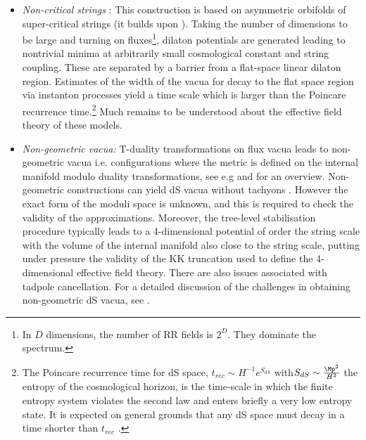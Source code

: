 \begin{itemize}

\item {\it Non-critical strings} \cite{Maloney:2002rr}: This construction is based on asymmetric orbifolds of super-critical strings
(it builds upon \cite{Silverstein:2001xn}).
 Taking  the  number of dimensions to be large and turning on fluxes\footnote{In $D$ dimensions, the number of RR fields
 is $2^{D}$. They dominate the spectrum.}, dilaton potentials are generated leading to nontrivial minima at arbitrarily small cosmological constant and string coupling. These are  separated by a barrier from a flat-space linear dilaton region. 
Estimates of the width of the vacua for decay to the flat space region via  instanton  processes yield a time scale which is larger than the Poincare recurrence time.\footnote{The Poincare recurrence time for dS space, $t_{rec} \sim H^{-1} e^{S_{dS}}$ with$S_{dS} \sim \frac{\Mp^2}{H^2}$ the entropy of the cosmological horizon, is the time-scale in which the finite entropy system violates the second law and enters briefly a very low entropy state.  It is expected on general grounds that any dS space must decay in a time shorter than $t_{rec}$ \cite{Goheer:2002vf, Kachru:2003sx}.} Much remains to be understood about the effective field theory of these models.


\item {\it Non-geometric vacua:}  T-duality transformations on flux vacua leads to non-geometric vacua i.e. configurations
where the metric is  defined on the internal manifold modulo  duality transformations,  see e.g \cite{Kachru:2002sk, Shelton:2005cf, Grana:2006kf} and \cite{Plauschinn:2018wbo} for an overview. Non-geometric constructions can yield dS vacua without tachyons \cite{deCarlos:2009fq, Danielsson:2012by, Blaback:2013ht, Damian:2013dq, Damian:2013dwa}. However the exact form of the moduli space is unknown, and this is required to check the 
 validity of the approximations. Moreover, the  tree-level stabilisation procedure typically leads to a 4-dimensional potential of order the string scale with the volume of the internal manifold also close to the string scale, putting under pressure the validity of the KK truncation used to define the 4-dimensional effective field theory. There are also issues associated
 with tadpole cancellation. For a detailed discussion of the challenges in obtaining non-geometric dS vacua, see \cite{Plauschinn:2020ram}.
 

\end{itemize}
